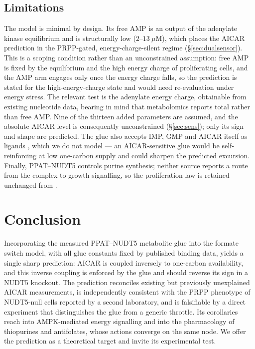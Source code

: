 \documentclass[a4paper,fleqn]{cas-sc}
\begin{document}
\subsection{Limitations}

The model is minimal by design. Its free AMP is an output of the adenylate kinase
equilibrium and is structurally low ($2$--$13~\mu$M), which places the AICAR
prediction in the PRPP-gated, energy-charge-silent regime (\S\ref{sec:dualsensor}).
This is a scoping condition rather than an unconstrained assumption: free AMP is
fixed by the equilibrium and the high energy charge of proliferating cells, and
the AMP arm engages only once the energy charge falls, so the prediction is
stated for the high-energy-charge state and would need re-evaluation under energy
stress. The relevant test is the adenylate energy charge, obtainable from
existing nucleotide data, bearing in mind that metabolomics reports total rather
than free AMP. Nine of the thirteen added parameters are assumed, and the
absolute AICAR level is consequently unconstrained (\S\ref{sec:sens}); only its
sign and shape are predicted. The glue also accepts IMP, GMP and AICAR itself as ligands
\citep{witus2026}, which we do not model --- an AICAR-sensitive glue would be
self-reinforcing at low one-carbon supply and could sharpen the predicted
excursion. Finally, PPAT--NUDT5 controls purine synthesis; neither source reports
a route from the complex to growth signalling, so the proliferation law is
retained unchanged from \citet{oizel2020}.

\section{Conclusion}

Incorporating the measured PPAT--NUDT5 metabolite glue into the formate switch
model, with all glue constants fixed by published binding data, yields a single
sharp prediction: AICAR is coupled inversely to one-carbon availability, and this
inverse coupling is enforced by the glue and should reverse its sign in a NUDT5
knockout. The prediction reconciles existing but previously unexplained AICAR
measurements, is independently consistent with the PRPP phenotype of NUDT5-null
cells reported by a second laboratory, and is falsifiable by a direct experiment
that distinguishes the glue from a generic throttle. Its corollaries reach into
AMPK-mediated energy signalling and into the pharmacology of thiopurines and
antifolates, whose actions converge on the same node. We offer the prediction as
a theoretical target and invite its experimental test.
\end{document}
